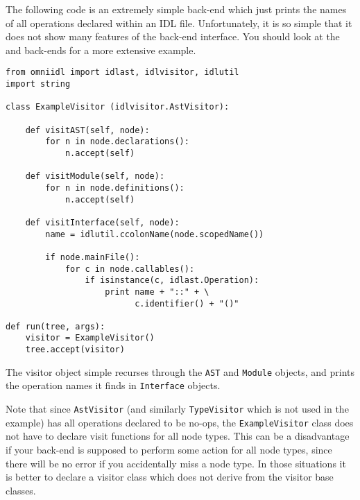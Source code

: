 \documentclass[11pt,twoside,a4paper]{article}
\newcommand{\class}[1]{\texttt{#1}}
\begin{document}
The following code is an extremely simple back-end which just prints
the names of all operations declared within an IDL file.
Unfortunately, it is so simple that it does not show many features of
the back-end interface. You should look at the  and
 back-ends for a more extensive example.

\begin{verbatim}
from omniidl import idlast, idlvisitor, idlutil
import string

class ExampleVisitor (idlvisitor.AstVisitor):

    def visitAST(self, node):
        for n in node.declarations():
            n.accept(self)

    def visitModule(self, node):
        for n in node.definitions():
            n.accept(self)

    def visitInterface(self, node):
        name = idlutil.ccolonName(node.scopedName())

        if node.mainFile():
            for c in node.callables():
                if isinstance(c, idlast.Operation):
                    print name + "::" + \
                          c.identifier() + "()"

def run(tree, args):
    visitor = ExampleVisitor()
    tree.accept(visitor)
\end{verbatim}

\noindent
The visitor object simple recurses through the \class{AST} and
\class{Module} objects, and prints the operation names it finds in
\class{Interface} objects.

Note that since \class{AstVisitor} (and similarly \class{TypeVisitor}
which is not used in the example) has all operations declared to be
no-ops, the \class{ExampleVisitor} class does not have to declare
visit functions for all node types. This can be a disadvantage if your
back-end is supposed to perform some action for all node types, since
there will be no error if you accidentally miss a node type. In those
situations it is better to declare a visitor class which does not
derive from the visitor base classes.
\end{document}
